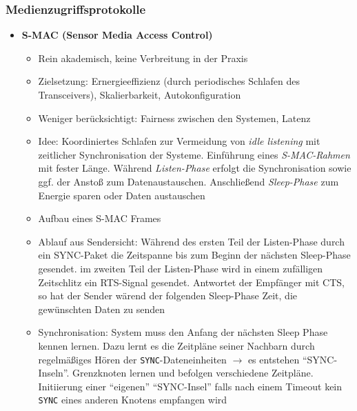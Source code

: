 \subsubsection{Medienzugriffsprotokolle}
\begin{itemize}
	\item \textbf{S-MAC (Sensor Media Access Control)}
	\begin{itemize}
		\item Rein akademisch, keine Verbreitung in der Praxis
		\item Zielsetzung: Ernergieeffizienz (durch periodisches Schlafen des Transceivers), Skalierbarkeit, Autokonfiguration
		\item Weniger berücksichtigt: Fairness zwischen den Systemen, Latenz
		\item Idee: Koordiniertes Schlafen zur Vermeidung von \textit{idle listening} mit zeitlicher Synchronisation der Systeme. Einführung eines \textit{S-MAC-Rahmen} mit fester Länge. Während \textit{Listen-Phase} erfolgt die Synchronisation sowie ggf. der Anstoß zum Datenaustauschen. Anschließend \textit{Sleep-Phase} zum Energie sparen oder Daten austauschen
		\item Aufbau eines S-MAC Frames
		\item Ablauf aus Sendersicht: Während des ersten Teil der Listen-Phase durch ein SYNC-Paket die Zeitspanne bis zum Beginn der nächsten Sleep-Phase gesendet. im zweiten Teil der Listen-Phase wird in einem zufälligen Zeitschlitz ein RTS-Signal gesendet. Antwortet der Empfänger mit CTS, so hat der Sender wärend der folgenden Sleep-Phase Zeit, die gewünschten Daten zu senden
		\item Synchronisation: System muss den Anfang der nächsten Sleep Phase kennen lernen. Dazu lernt es die Zeitpläne seiner Nachbarn durch regelmäßiges Hören der \texttt{SYNC}-Dateneinheiten \(\rightarrow\) es entstehen "`SYNC-Inseln"'. Grenzknoten lernen und befolgen verschiedene Zeitpläne. Initiierung einer "`eigenen"' "`SYNC-Insel"' falls nach einem Timeout kein \texttt{SYNC} eines anderen Knotens empfangen wird

\end{itemize}
\end{itemize}
